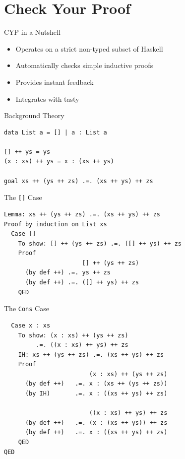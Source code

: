 \documentclass{beamer}
\begin{document}
\section{Check Your Proof}

\begin{frame}{CYP in a Nutshell}

\begin{itemize}[<+->]
  \item Operates on a strict non-typed subset of Haskell
  \item Automatically checks simple inductive proofs
  \item Provides instant feedback
  \item Integrates with tasty
\end{itemize}
\end{frame}

\begin{frame}[fragile]{Background Theory}
  \begin{lstlisting}
data List a = [] | a : List a

[] ++ ys = ys
(x : xs) ++ ys = x : (xs ++ ys)

goal xs ++ (ys ++ zs) .=. (xs ++ ys) ++ zs
  \end{lstlisting}
\end{frame}

\begin{frame}[fragile]{The \texttt{[]} Case}
  \begin{lstlisting}
Lemma: xs ++ (ys ++ zs) .=. (xs ++ ys) ++ zs
Proof by induction on List xs
  Case []
    To show: [] ++ (ys ++ zs) .=. ([] ++ ys) ++ zs
    Proof
                      [] ++ (ys ++ zs)
      (by def ++) .=. ys ++ zs
      (by def ++) .=. ([] ++ ys) ++ zs
    QED
  \end{lstlisting}
\end{frame}

\begin{frame}[fragile]{The \texttt{Cons} Case}
  \begin{lstlisting}
  Case x : xs
    To show: (x : xs) ++ (ys ++ zs)
         .=. ((x : xs) ++ ys) ++ zs
    IH: xs ++ (ys ++ zs) .=. (xs ++ ys) ++ zs
    Proof
                        (x : xs) ++ (ys ++ zs)
      (by def ++)   .=. x : (xs ++ (ys ++ zs))
      (by IH)       .=. x : ((xs ++ ys) ++ zs)

                        ((x : xs) ++ ys) ++ zs
      (by def ++)   .=. (x : (xs ++ ys)) ++ zs
      (by def ++)   .=. x : ((xs ++ ys) ++ zs)
    QED
QED
  \end{lstlisting}
\end{frame}
\end{document}
